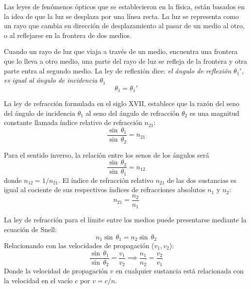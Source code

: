 Las leyes de fenómenos ópticos que se establecieron en la física, están basados en la idea de que la luz se desplaza por una línea recta. La luz se representa como un rayo que cambia su dirección de desplazamiento al pasar de un medio al otro, o al reflejarse en la frontera de dos medios.

Cuando un rayo de luz que viaja a través de un medio, encuentra una frontera que lo lleva a otro medio, una parte del rayo de luz se refleja de la frontera y otra parte entra al segundo medio. La ley de reflexión dice: \textit{el ángulo de reflexión $\theta_1'$, es igual al ángulo de incidencia $\theta_1$}
\begin{equation}
    \theta_1 = \theta_1'
\end{equation}

La ley de refracción formulada en el siglo XVII, establece que la razón del seno del ángulo de incidencia $\theta_1$ al seno del ángulo de refracción $\theta_2$ es una magnitud constante llamada índice relativo de refracción $n_{21}$:
\begin{equation}
    \frac{\sin  \, \theta_1}{\sin  \, \theta_2} = n_{21}
\end{equation}

Para el sentido inverso, la relación entre los senos de los ángulos será
\begin{equation}
    \frac{\sin  \, \theta_2}{\sin  \, \theta_1} = n_{12}
\end{equation}
donde $n_{12} = 1/n_{21}$. El índice de refracción relativo $n_{21}$ de las dos sustancias es igual al cociente de sus respectivos índices de refracciones absolutos $n_1$ y $n_2$:
\begin{equation}
    n_{21} = \frac{n_2}{n_1}
\end{equation}

La ley de refracción para el límite entre los medios puede presentarse mediante la ecuación de Snell:
\begin{equation}
    n_1 \sin  \, \theta_1 = n_2 \sin  \, \theta_2
\end{equation}
Relacionando con las velocidades de propagación ($v_1, v_2$):
\begin{equation}
    \frac{\sin  \, \theta_1}{\sin  \, \theta_2} = \frac{v_1}{v_2} \implies \frac{n_1}{n_2} = \frac{v_2}{v_1}
\end{equation}
Donde la velocidad de propagación $v$ en cualquier sustancia está relacionada con la velocidad en el vacío $c$ por $v = c/n$.




